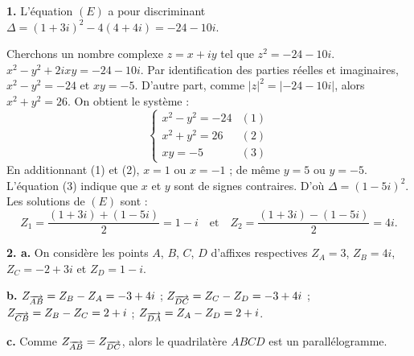 \documentclass[11pt]{article}
\begin{document}

\textbf{1.} L'équation $(E)$ a pour discriminant $\Delta = (1 + 3i)^2 - 4(4 + 4i) = -24 - 10i$.

Cherchons un nombre complexe $z = x + iy$ tel que $z^2 = -24 - 10i$. $x^2 - y^2 + 2ixy = -24 - 10i$. Par identification des parties réelles et imaginaires, $x^2 - y^2 = -24$ et $xy = -5$. D'autre part, comme $|z|^2 = |-24 - 10i|$, alors $x^2 + y^2 = 26$. On obtient le système :
\[ \begin{cases} x^2 - y^2 = -24 & (1) \\ x^2 + y^2 = 26 & (2) \\ xy = -5 & (3) \end{cases} \]
En additionnant (1) et (2), $x = 1$ ou $x = -1$ ; de même $y = 5$ ou $y = -5$. L'équation (3) indique que $x$ et $y$ sont de signes contraires. D'où $\Delta = (1 - 5i)^2$. Les solutions de $(E)$ sont :
\[ Z_1 = \frac{(1 + 3i) + (1 - 5i)}{2} = 1 - i \quad \text{et} \quad Z_2 = \frac{(1 + 3i) - (1 - 5i)}{2} = 4i. \]

\textbf{2. a.} On considère les points $A$, $B$, $C$, $D$ d'affixes respectives $Z_A = 3$, $Z_B = 4i$, $Z_C = -2 + 3i$ et $Z_D = 1 - i$.
\begin{center}
\end{center}

\textbf{b.} $Z_{\overrightarrow{AB}} = Z_B - Z_A = -3 + 4i$ ; $Z_{\overrightarrow{DC}} = Z_C - Z_D = -3 + 4i$ ; $Z_{\overrightarrow{CB}} = Z_B - Z_C = 2 + i$ ; $Z_{\overrightarrow{DA}} = Z_A - Z_D = 2 + i$.

\textbf{c.} Comme $Z_{\overrightarrow{AB}} = Z_{\overrightarrow{DC}}$, alors le quadrilatère $ABCD$ est un parallélogramme.

\prob{}
\end{document}
